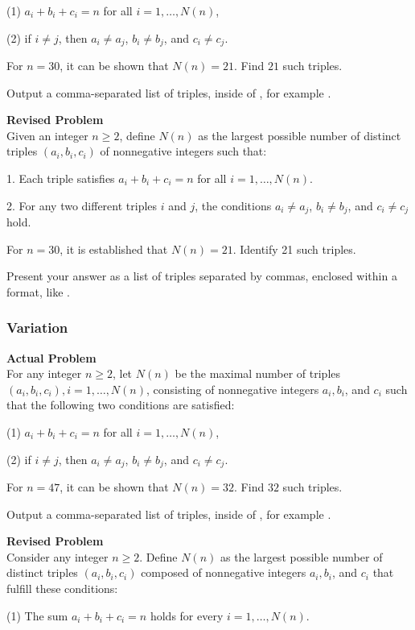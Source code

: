 (1) $a_i+b_i+c_i=n$ for all $i=1,\ldots,N(n)$,

(2) if $i \neq j$, then $a_i \neq a_j$, $b_i \neq b_j$, and $c_i \neq c_j$.

For $n = 30$, it can be shown that $N(n)=21$. Find $21$ such triples.


Output a comma-separated list of triples, inside of \boxed, for example .

\textbf{Revised Problem}\\
Given an integer \( n \geq 2 \), define \( N(n) \) as the largest possible number of distinct triples \((a_i, b_i, c_i)\) of nonnegative integers such that:

1. Each triple satisfies \(a_i + b_i + c_i = n\) for all \(i = 1, \ldots, N(n)\).

2. For any two different triples \(i\) and \(j\), the conditions \(a_i \neq a_j\), \(b_i \neq b_j\), and \(c_i \neq c_j\) hold.

For \(n = 30\), it is established that \(N(n) = 21\). Identify 21 such triples.

Present your answer as a list of triples separated by commas, enclosed within a \boxed format, like .

\subsubsection{Variation}
\textbf{Actual Problem}\\
For any integer $n \geq 2$, let $N(n)$ be the maximal number of triples $(a_i, b_i, c_i), i=1,\ldots,N(n)$, consisting of nonnegative integers $a_i, b_i$, and $c_i$ such that the following two conditions are satisfied:

(1) $a_i+b_i+c_i=n$ for all $i=1,\ldots,N(n)$,

(2) if $i \neq j$, then $a_i \neq a_j$, $b_i \neq b_j$, and $c_i \neq c_j$.

For $n = 47$, it can be shown that $N(n)=32$. Find $32$ such triples.


Output a comma-separated list of triples, inside of \boxed, for example .

\textbf{Revised Problem}\\
Consider any integer \( n \geq 2 \). Define \( N(n) \) as the largest possible number of distinct triples \((a_i, b_i, c_i)\) composed of nonnegative integers \( a_i, b_i \), and \( c_i \) that fulfill these conditions:

(1) The sum \( a_i + b_i + c_i = n \) holds for every \( i = 1, \ldots, N(n) \).

